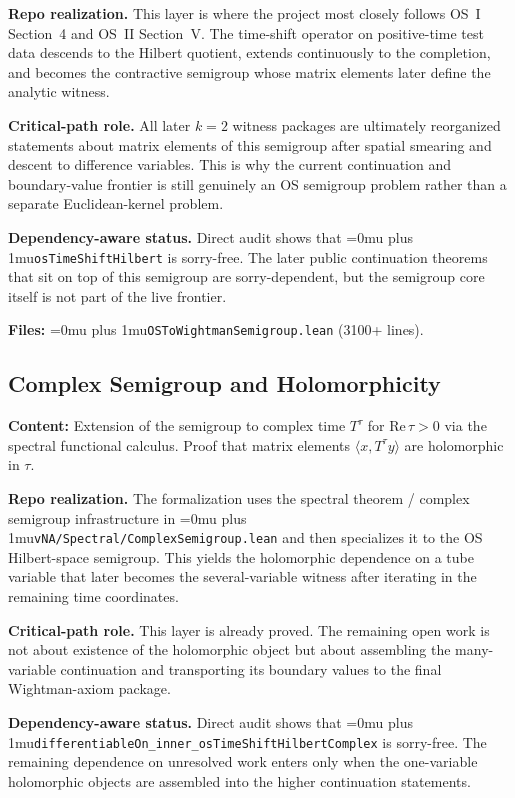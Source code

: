 \documentclass[11pt,a4paper]{article}
\newcommand{\leanfile}[1]{\begingroup\Urlmuskip=0mu plus 1mu\relax\nolinkurl{#1}\endgroup}
\newcommand{\leanname}[1]{\begingroup\Urlmuskip=0mu plus 1mu\relax\nolinkurl{#1}\endgroup}
\begin{document}
\medskip\noindent
\textbf{Repo realization.}
This layer is where the project most closely follows OS~I Section~4 and OS~II
Section~V. The time-shift operator on positive-time test data descends to the
Hilbert quotient, extends continuously to the completion, and becomes the
contractive semigroup whose matrix elements later define the analytic witness.

\medskip\noindent
\textbf{Critical-path role.}
All later $k=2$ witness packages are ultimately reorganized statements about
matrix elements of this semigroup after spatial smearing and descent to
difference variables. This is why the current continuation and boundary-value
frontier is still genuinely an OS semigroup problem rather than a separate
Euclidean-kernel problem.

\medskip\noindent
\textbf{Dependency-aware status.}
Direct audit shows that \leanname{osTimeShiftHilbert} is sorry-free. The later
public continuation theorems that sit on top of this semigroup are
sorry-dependent, but the semigroup core itself is not part of the live frontier.

\textbf{Files:} \leanname{OSToWightmanSemigroup.lean} (3100+ lines).

\subsection{Complex Semigroup and Holomorphicity}

\textbf{Content:} Extension of the semigroup to complex time
$T^\tau$ for $\mathrm{Re}\,\tau > 0$ via the spectral functional
calculus. Proof that matrix elements $\langle x, T^\tau y \rangle$
are holomorphic in $\tau$.

\medskip\noindent
\textbf{Repo realization.}
The formalization uses the spectral theorem / complex semigroup infrastructure in
\leanfile{vNA/Spectral/ComplexSemigroup.lean} and then specializes it to the OS
Hilbert-space semigroup. This yields the holomorphic dependence on a tube
variable that later becomes the several-variable witness after iterating in the
remaining time coordinates.

\medskip\noindent
\textbf{Critical-path role.}
This layer is already proved. The remaining open work is not about existence of
the holomorphic object but about assembling the many-variable continuation and
transporting its boundary values to the final Wightman-axiom package.

\medskip\noindent
\textbf{Dependency-aware status.}
Direct audit shows that
\leanname{differentiableOn\_inner\_osTimeShiftHilbertComplex} is sorry-free. The
remaining dependence on unresolved work enters only when the one-variable
holomorphic objects are assembled into the higher continuation statements.
\end{document}
